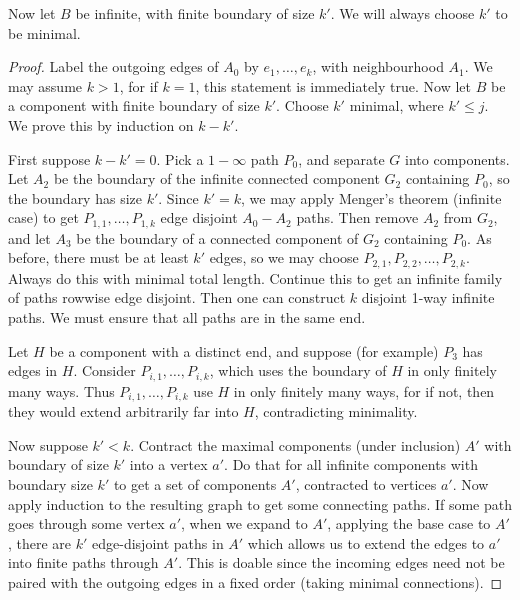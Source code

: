 \documentclass[11pt, a4paper]{memoir}
\theoremstyle{change}
\theoremstyle{plain}
\theoremstyle{nonumberplain}
\newtheorem{proof}{Proof}
\numberwithin{equation}{section}
\begin{document}
Now let $B$ be infinite, with finite boundary of size $k'$.
We will always choose $k'$ to be minimal.
\begin{proof}
    Label the outgoing edges of $A_0$ by $e_1,\ldots,e_k$, with neighbourhood $A_1$.
    We may assume $k>1$, for if $k=1$, this statement is immediately true.
    Now let $B$ be a component with finite boundary of size $k'$.
    Choose $k'$ minimal, where $k'\leq j$.
    We prove this by induction on $k-k'$.

    First suppose $k-k'=0$.
    Pick a $1-\infty$ path $P_0$, and separate $G$ into components.
    Let $A_2$ be the boundary of the infinite connected component $G_2$ containing $P_0$, so the boundary has size $k'$.
    Since $k'=k$, we may apply Menger's theorem (infinite case) to get $P_{1,1},\ldots,P_{1,k}$ edge disjoint $A_0-A_2$ paths.
    Then remove $A_2$ from $G_2$, and let $A_3$ be the boundary of a connected component of $G_2$ containing $P_0$.
    As before, there must be at least $k'$ edges, so we may choose $P_{2,1},P_{2,2},\ldots,P_{2,k}$.
    Always do this with minimal total length.
    Continue this to get an infinite family of paths rowwise edge disjoint.
    Then one can construct $k$ disjoint 1-way infinite paths.
    We must ensure that all paths are in the same end.

    Let $H$ be a component with a distinct end, and suppose (for example) $P_3$ has edges in $H$.
    Consider $P_{i,1},\ldots,P_{i,k}$, which uses the boundary of $H$ in only finitely many ways.
    Thus $P_{i,1},\ldots,P_{i,k}$ use $H$ in only finitely many ways, for if not, then they would extend arbitrarily far into $H$, contradicting minimality.

    Now suppose $k'<k$.
    Contract the maximal components (under inclusion) $A'$ with boundary of size $k'$ into a vertex $a'$.
    Do that for all infinite components with boundary size $k'$ to get a set of components $A'$, contracted to vertices $a'$.
    Now apply induction to the resulting graph to get some connecting paths.
    If some path goes through some vertex $a'$, when we expand to $A'$, applying the base case to $A'$, there are $k'$ edge-disjoint paths in $A'$ which allows us to extend the edges to $a'$ into finite paths through $A'$.
    This is doable since the incoming edges need not be paired with the outgoing edges in a fixed order (taking minimal connections).
\end{proof}
\end{document}
